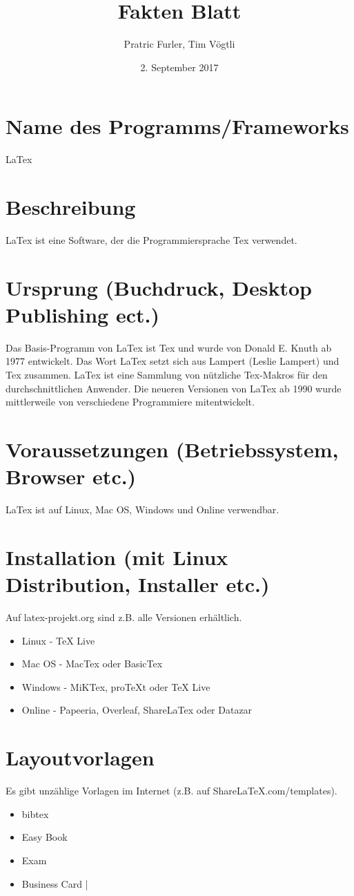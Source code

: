 \documentclass[12pt]{article}
\title{Fakten Blatt}
\author{Pratric Furler, Tim Vögtli}
\date{2. September 2017}
\begin{document}
\maketitle

\section{Name des Programms/Frameworks}
LaTex

\section{Beschreibung}
LaTex ist eine Software, der die Programmiersprache Tex verwendet.

\section{Ursprung (Buchdruck, Desktop Publishing ect.)}

Das Basis-Programm von LaTex ist Tex und wurde von Donald E. Knuth ab 1977 entwickelt.
Das Wort LaTex setzt sich aus Lampert (Leslie Lampert) und Tex zusammen.
LaTex ist eine Sammlung von nützliche Tex-Makros für den durchschnittlichen Anwender.
Die neueren Versionen von LaTex ab 1990 wurde mittlerweile von verschiedene Programmiere mitentwickelt.

\section{Voraussetzungen (Betriebssystem, Browser etc.)}

LaTex ist auf Linux, Mac OS, Windows und Online verwendbar.

\section{Installation (mit Linux Distribution, Installer etc.)}

Auf latex-projekt.org sind z.B. alle Versionen erhältlich.
\begin{itemize}
	\item Linux - TeX Live
	\item Mac OS - MacTex oder BasicTex
	\item Windows - MiKTex, proTeXt oder TeX Live
	\item Online - Papeeria, Overleaf, ShareLaTex oder Datazar
\end{itemize}

\section{Layoutvorlagen}
Es gibt unzählige Vorlagen im Internet (z.B. auf ShareLaTeX.com/templates).
\begin{itemize}
	\item bibtex
	\item Easy Book
	\item Exam
	\item Business Card
|\end{itemize}
\end{document}
